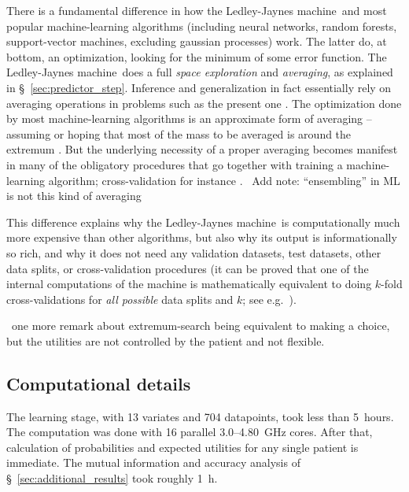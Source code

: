 \documentclass[utf8]{FrontiersinHarvard} %
\newcommand*{\wrench}{{\fontencoding{U}\fontfamily{fontawesomethree}\selectfont\symbol{114}}}
\newcommand*{\pencil}{{\fontencoding{U}\fontfamily{fontawesometwo}\selectfont\symbol{210}}}
\newcommand{\mynotew}[1]{{\color{notecolour}\wrench\ #1}}
\newcommand{\mynotep}[1]{{\color{notecolour}\pencil\ #1}}
\newcommand*{\sect}{\S}%
\newcommand*{\sects}{\S\S}%
\newcommand*{\chap}{ch.}%
\newcommand*{\eg}{{e.g.}}
\renewcommand*{\|}[1][]{\nonscript\:#1\vert\nonscript\:\mathopen{}}
\newcommand*{\ljm}{Ledley-Jaynes machine}
\begin{document}
There is a fundamental difference in how the \ljm\ and most popular machine-learning algorithms (including neural networks, random forests, support-vector machines, excluding gaussian processes) work. The latter do, at bottom, an optimization, looking for the minimum of some error function. The \ljm\ does a full \emph{space exploration} and \emph{averaging}, as explained in \sect~\ref{sec:predictor_step}. Inference and generalization in fact essentially rely on averaging operations in problems such as the present one \citetext{\citealt{definetti1930,definetti1937,dawid2013}; \citealt[\sects~4.2--4.3]{bernardoetal1994_r2000}; see also \citealt{selfetal1987}}. The optimization done by most machine-learning algorithms is an approximate form of averaging -- assuming or hoping that most of the mass to be averaged is around the extremum \citep[\chap~16]{mackay1992,murphy2012}. But the underlying necessity of a proper averaging becomes manifest in many of the obligatory procedures that go together with training a machine-learning algorithm; cross-validation for instance \citep{mackay1992b}. \mynotew{Add note: \enquote{ensembling} in ML is not this kind of averaging \citep[\sect~18.2]{murphy2022}}

This difference explains why the \ljm\ is computationally much more expensive than other algorithms, but also why its output is informationally so rich, and why it does not need any validation datasets, test datasets, other data splits, or cross-validation procedures (it can be proved that one of the internal computations of the machine is mathematically equivalent to doing $k$-fold cross-validations for \emph{all possible} data splits and $k$; see \eg\ \citealt{portamana2019b,fongetal2020}).

\mynotep{one more remark about extremum-search being equivalent to making a choice, but the utilities are not controlled by the patient and not flexible.}


\subsection{Computational details}
\label{sec:comput_details}

The learning stage, with 13 variates and 704 datapoints, took less than 5~hours. The computation was done with 16 parallel 3.0--4.80~GHz cores. After that, calculation of probabilities and expected utilities for any single patient is immediate. The mutual information and accuracy analysis of \sect~\ref{sec:additional_results} took roughly 1~h.
\end{document}
